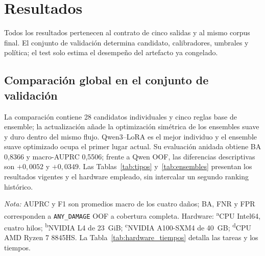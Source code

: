\section{Resultados}

Todos los resultados pertenecen al contrato de cinco salidas y al mismo corpus final. El conjunto de validación determina candidato, calibradores, umbrales y política; el test solo estima el desempeño del artefacto ya congelado.

\subsection{Comparación global en el conjunto de validación}

La comparación contiene 28 candidatos individuales y cinco reglas base de ensemble; la actualización añade la optimización simétrica de los ensembles suave y duro dentro del mismo flujo. Qwen3--LoRA es el mejor individuo y el ensemble suave optimizado ocupa el primer lugar actual. Su evaluación anidada obtiene BA 0,8366 y macro-AUPRC 0,5506; frente a Qwen OOF, las diferencias descriptivas son $+0,0052$ y $+0,0349$. Las Tablas~\ref{tab:tipos} y~\ref{tab:ensembles} presentan los resultados vigentes y el hardware empleado, sin intercalar un segundo ranking histórico.

\begin{table}[t]
\centering
\caption{Mejor candidato por tipo en el conjunto de validación OOF. Fuente: elaboración propia a partir de los registros de la comparación integrada.}
\label{tab:tipos}
\footnotesize
{}
\begin{minipage}{.98\columnwidth}\vspace{1mm}\footnotesize
\emph{Nota:} AUPRC y F1 son promedios macro de los cuatro daños; BA, FNR y FPR corresponden a \texttt{ANY\_DAMAGE} OOF a cobertura completa. Hardware: \textsuperscript{a}CPU Intel64, cuatro hilos; \textsuperscript{b}NVIDIA L4 de 23~GiB; \textsuperscript{c}NVIDIA A100-SXM4 de 40~GB; \textsuperscript{d}CPU AMD Ryzen 7 8845HS. La Tabla~\ref{tab:hardware_tiempos} detalla las tareas y los tiempos.
\end{minipage}
\end{table}

